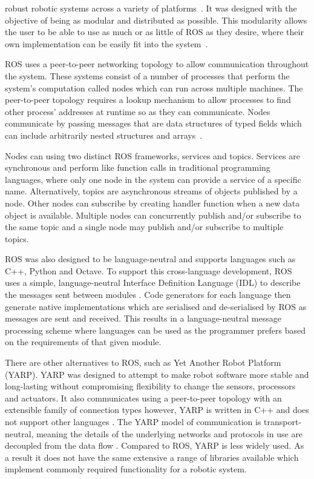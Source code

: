 robust robotic systems across a variety of platforms~\cite{aboutROS}. 
It was designed with the objective of being as modular and distributed
as possible. This modularity allows the user to be able to use as much or
as little of ROS as they desire, where their own implementation can be
easily fit into the system~\cite{rosForMe}.

ROS uses a peer-to-peer networking topology to allow communication 
throughout the system. These systems consist of a number of processes  
that perform the system's computation called nodes which can  
run across multiple machines. The peer-to-peer topology requires 
a lookup mechanism to allow processes to find other process' addresses at 
runtime so as they can communicate. Nodes communicate by passing messages 
that are data structures of typed fields which can include arbitrarily nested 
structures and arrays~\cite{crick2017rosbridge}.


Nodes can using two distinct ROS frameworks, services and topics. 
Services are synchronous and perform like function
calls in traditional programming languages, where only one node in the 
system can provide a service of a specific name. Alternatively, topics are
asynchronous streams of objects published by a node. Other nodes can 
subscribe by creating  handler function when a new data object is available.
Multiple nodes can concurrently publish and/or subscribe to the same topic and
a single node may publish and/or subscribe to multiple topics.

ROS was also designed to be language-neutral and supports languages 
such as C++, Python and Octave. To support this cross-language 
development, ROS uses a simple, language-neutral Interface Definition 
Language (IDL) to describe the messages sent between modules 
\cite{quigley2009ros}. Code generators for each language then generate 
native implementations which are serialised and de-serialised by ROS 
as messages are sent and received. This results in a language-neutral 
message processing scheme where languages can be used as the programmer 
prefers based on the requirements of that given module. 

There are other alternatives to ROS, such as Yet Another Robot Platform 
(YARP). YARP was designed to attempt to make robot software more stable 
and long-lasting without compromising flexibility to change the sensors, 
processors and actuators. It also communicates using a peer-to-peer 
topology with an extensible family of connection types however, YARP is 
written in C++ and does not support other languages \cite{aboutYARP}.
The YARP model of communication is transport-neutral, meaning the details 
of the underlying networks and protocols in use are decoupled from the 
data flow \cite{exactlyIsYARP}. Compared to ROS, YARP is less widely used.
As a result it does not have the same extensive a range of libraries available 
which implement commonly required functionality for a robotic system.

